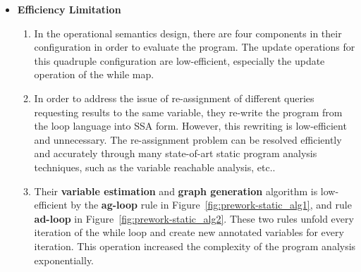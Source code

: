 {\begin{itemize}
\\
The estimated adaptivity from this framework is loose.
It naively composed three standard static estimation algorithms without improvement.
The naive \textbf{graph generation} algorithm over-approximates data dependency relation in a large scale.
 \item \textbf{Efficiency Limitation}
 \begin{enumerate}
    \item In the operational semantics design, there are four components in their configuration in order to evaluate the program. 
    The update operations for this quadruple configuration are low-efficient, especially the update operation of the while map.   
    \item
    In order to address the issue of re-assignment of different queries requesting results to the same variable, they re-write the program from the loop language into SSA form.
    However, this rewriting is low-efficient and unnecessary.
    The re-assignment problem can be resolved efficiently and accurately through many state-of-art static program analysis techniques, such as the
    variable reachable analysis, etc..
    \item Their \textbf{variable estimation} and \textbf{graph generation}  algorithm is low-efficient by the \textbf{ag-loop} rule in Figure~\ref{fig:prework-static_alg1},
    and rule \textbf{ad-loop} in Figure~\ref{fig:prework-static_alg2}.
    These two rules unfold every iteration of the while loop and create new annotated variables for every iteration.
    This operation increased the complexity of the program analysis exponentially. 
    \end{enumerate}
\end{itemize}
}  

